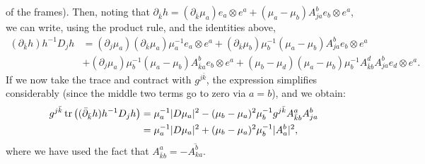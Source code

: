 \documentclass{../mathnotes}
\begin{document}
\begin{enumerate}[(a)]
        of the frames). Then, noting that $\partial_{\bar k}h=(\partial_{\bar k}\mu_a)e_a\otimes e^a+(\mu_a-\mu_b)A_{ja}^be_b\otimes e^a$,
        we can write, using the product rule, and the identities above,
        \begin{align*}
            (\partial_{\bar k}h)h^{-1}D_jh &=(\partial_j\mu_a)(\partial_{\bar k}\mu_a)\mu_a^{-1}e_a\otimes e^a + (\partial_{\bar k}\mu_b)\mu_b^{-1}(\mu_a-\mu_b)A^b_{ja}e_b\otimes e^a\\
            &+(\partial_j\mu_a)\mu_b^{-1}(\mu_a-\mu_b)A^b_{\bar ka}e_b\otimes e^a+(\mu_b-\mu_d)(\mu_a-\mu_b)\mu^{-1}_bA_{\bar kb}^dA_{ja}^b e_d\otimes e^a.
        \end{align*}
        If we now take the trace and contract with $g^{j\bar k}$, the expression simplifies considerably (since the middle two terms go to zero via $a=b$),
        and we obtain:
        \begin{align*}
            g^{j\bar k}\operatorname{tr}\left( (\bar\partial_{\bar k}h)h^{-1}D_jh  \right) &= \mu_a^{-1}|D\mu_a|^2-(\mu_b-\mu_a)^2\mu_b^{-1}g^{j\bar k}A_{\bar kb}^aA^b_{ja}\\
            &= \mu_a^{-1}|D\mu_a|^2+(\mu_b-\mu_a)^2\mu_b^{-1}|A^b_a|^2,
        \end{align*}
        where we have used the fact that $A_{\bar kb}^a=-\overline{A^b_{ka}}$.
\end{enumerate}
\end{document}
